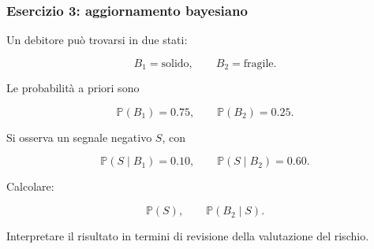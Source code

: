 \documentclass[handout]{beamer}%
\providecommand{\Prob}{\mathbb{P}}
\providecommand{\1}{\mathbf{1}}
\providecommand{\QTR}[2]{\csname #1\endcsname{#2}}
\begin{document}
\begin{frame}%
%

\frametitle{Esercizio 3: aggiornamento bayesiano}%


Un debitore pu\`{o} trovarsi in due stati:%

\[
B_{1}=\text{solido},\qquad B_{2}=\text{fragile}.
\]


Le probabilit\`{a} a priori sono%

\[
\Prob(B_{1})=0.75,\qquad\Prob(B_{2})=0.25.
\]


\medskip

Si osserva un segnale negativo $S$, con%

\[
\Prob(S\mid B_{1})=0.10, \qquad\Prob(S\mid B_{2})=0.60.
\]


\medskip

Calcolare:%

\[
\Prob(S), \qquad\Prob(B_{2}\mid S).
\]


Interpretare il risultato in termini di revisione della valutazione del rischio.%

\transboxout
\end{frame}%
\end{document}
